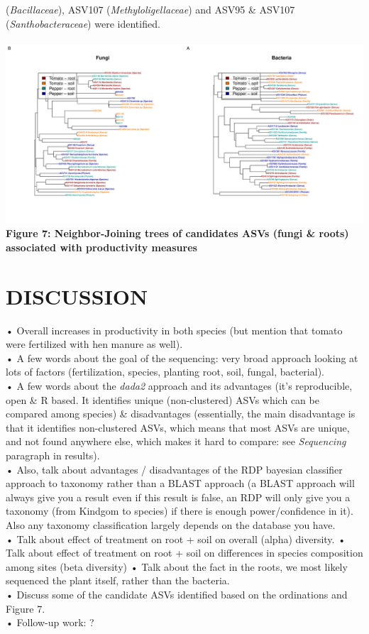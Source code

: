 \documentclass[11pt,]{article}
\begin{document}
(\emph{Bacillaceae}), ASV107 (\emph{Methyloligellaceae}) and ASV95 \&
ASV107 (\emph{Santhobacteraceae}) were identified. ~\\
\hspace*{0.333em}\\
\includegraphics{../figures/Figure7_candidateASVs.pdf}\\
\textbf{Figure 7: Neighbor-Joining trees of candidates ASVs (fungi \&
roots) associated with productivity measures} ~\\
\hspace*{0.333em}

\newpage  

\section{DISCUSSION}\label{discussion}

• Overall increases in productivity in both species (but mention that
tomato were fertilized with hen manure as well).\\
• A few words about the goal of the sequencing: very broad approach
looking at lots of factors (fertilization, species, planting root, soil,
fungal, bacterial).\\
• A few words about the \emph{dada2} approach and its advantages (it's
reproducible, open \& R based. It identifies unique (non-clustered) ASVs
which can be compared among species) \& disadvantages (essentially, the
main disadvantage is that it identifies non-clustered ASVs, which means
that most ASVs are unique, and not found anywhere else, which makes it
hard to compare: see \emph{Sequencing} paragraph in results).\\
• Also, talk about advantages / disadvantages of the RDP bayesian
classifier approach to taxonomy rather than a BLAST approach (a BLAST
approach will always give you a result even if this result is false, an
RDP will only give you a taxonomy (from Kindgom to species) if there is
enough power/confidence in it). Also any taxonomy classification largely
depends on the database you have.\\
• Talk about effect of treatment on root + soil on overall (alpha)
diversity. • Talk about effect of treatment on root + soil on
differences in species composition among sites (beta diversity) • Talk
about the fact in the roots, we most likely sequenced the plant itself,
rather than the bacteria.\\
• Discuss some of the candidate ASVs identified based on the ordinations
and Figure 7.\\
• Follow-up work: ?
\end{document}
